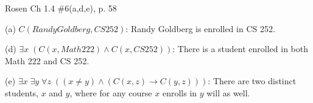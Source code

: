 \documentclass[12pt]{exam}
\newenvironment{my_parts}{
\begin{parts}
    \setlength{\itemsep}{1pt}
    \setlength{\parskip}{0pt}
    \setlength{\parsep}{0pt}
}{\end{parts}}
\newenvironment{my_item}{
\begin{itemize}
    \setlength{\itemsep}{1pt}
    \setlength{\parskip}{0pt}
    \setlength{\parsep}{0pt}
}{\end{itemize}}
\begin{document}
\begin{questions}


\question[6] Rosen Ch 1.4 \#6(a,d,e), p. 58
    \begin{solution}
    \begin{my_item}
        \item[(a)] $C(Randy Goldberg, CS 252)$: Randy Goldberg is enrolled in CS 252.
        \item[(d)] $\exists x\; (C(x, Math 222) \wedge C(x, CS 252))$: There is a student enrolled in both Math 222 and CS 252.
        \item[(e)] $\exists x\; \exists y\; \forall z\; ((x \neq y) \wedge (C(x,z) \rightarrow C(y,z)))$: There are two distinct students, $x$ and $y$, where for any course $x$ enrolls in $y$ will as well.
    \end{my_item}
    \end{solution}



\end{questions}
\end{document}
